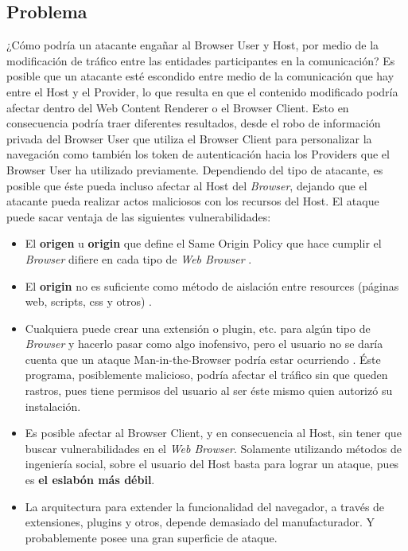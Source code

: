 \documentclass{sig-alternate-05-2015}
\begin{document}
\subsection{Problema}
¿Cómo podría un atacante engañar al Browser User y Host, por medio de la modificación de tráfico entre las entidades participantes en la comunicación? Es posible que un atacante esté escondido entre medio de la comunicación que hay entre el Host y el Provider, lo que resulta en que el contenido modificado podría afectar dentro del Web Content Renderer o el Browser Client. Esto en consecuencia podría traer diferentes resultados, desde el robo de información privada del Browser User que utiliza el Browser Client para personalizar la navegación como también los token de autenticación hacia los Providers que el Browser User ha utilizado previamente. Dependiendo del tipo de atacante, es posible que éste pueda incluso afectar al Host del \textit{Browser}, dejando que el atacante pueda realizar actos maliciosos con los recursos del Host. 
El ataque puede sacar ventaja de las siguientes vulnerabilidades:
\begin{itemize}
  \item El \textbf{origen} u \textbf{origin} que define el Same Origin Policy que hace cumplir el \textit{Browser} difiere en cada tipo de \textit{Web Browser} \cite{W3C-SOP,Reis2009, Jackson2008, Crowley2010, Paola2006}.
  \item El \textbf{origin} no es suficiente como método de aislación entre resources (páginas web, scripts, css y otros) \cite{Silic2010, Barth2009, Yason, Liu2012}.
  \item Cualquiera puede crear una extensión o plugin, etc. para algún tipo de \textit{Browser} y hacerlo pasar como algo inofensivo, pero el usuario no se daría cuenta que un ataque Man-in-the-Browser podría estar ocurriendo \cite{Dougan2012,Utakrit2009,Liu2012,Barth2010}.  Éste programa, posiblemente malicioso, podría afectar el tráfico sin que queden rastros, pues tiene permisos del usuario al ser éste mismo quien autorizó su instalación.
  \item Es posible afectar al Browser Client, y en consecuencia al Host, sin tener que buscar vulnerabilidades en el \textit{Web Browser}. Solamente utilizando métodos de ingeniería social, sobre el usuario del Host basta para lograr un ataque, pues es \textbf{el eslabón más débil}.
  \item La arquitectura para extender la funcionalidad del navegador, a través de extensiones, plugins y otros, depende demasiado del manufacturador. Y probablemente posee una gran superficie de ataque.
\end{itemize}
\end{document}
